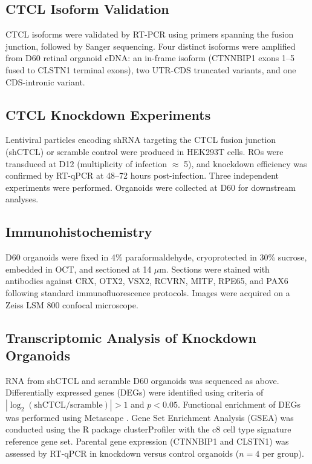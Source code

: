 \documentclass[12pt]{article}
\begin{document}
\subsection{CTCL Isoform Validation}

CTCL isoforms were validated by RT-PCR using primers spanning the fusion junction, followed by Sanger sequencing. Four distinct isoforms were amplified from D60 retinal organoid cDNA: an in-frame isoform (CTNNBIP1 exons 1--5 fused to CLSTN1 terminal exons), two UTR-CDS truncated variants, and one CDS-intronic variant.

\subsection{CTCL Knockdown Experiments}

Lentiviral particles encoding shRNA targeting the CTCL fusion junction (shCTCL) or scramble control were produced in HEK293T cells. ROs were transduced at D12 (multiplicity of infection $\approx$ 5), and knockdown efficiency was confirmed by RT-qPCR at 48--72 hours post-infection. Three independent experiments were performed. Organoids were collected at D60 for downstream analyses.

\subsection{Immunohistochemistry}

D60 organoids were fixed in 4\% paraformaldehyde, cryoprotected in 30\% sucrose, embedded in OCT, and sectioned at 14 $\mu$m. Sections were stained with antibodies against CRX, OTX2, VSX2, RCVRN, MITF, RPE65, and PAX6 following standard immunofluorescence protocols. Images were acquired on a Zeiss LSM 800 confocal microscope.

\subsection{Transcriptomic Analysis of Knockdown Organoids}

RNA from shCTCL and scramble D60 organoids was sequenced as above. Differentially expressed genes (DEGs) were identified using criteria of $|\log_2(\text{shCTCL/scramble})| > 1$ and $p < 0.05$. Functional enrichment of DEGs was performed using Metascape \citep{zhou2019metascape}. Gene Set Enrichment Analysis (GSEA) was conducted using the R package clusterProfiler \citep{yu2012clusterprofiler} with the c8 cell type signature reference gene set. Parental gene expression (CTNNBIP1 and CLSTN1) was assessed by RT-qPCR in knockdown versus control organoids ($n = 4$ per group).
\end{document}
